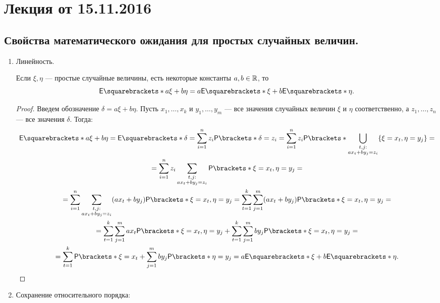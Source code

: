 \section {Лекция от 15.11.2016}

\subsection{Свойства математического ожидания для простых случайных величин.}

\begin{enumerate}
    \item Линейность. \par
    Если $ \xi, \eta $ --- простые случайные величины, есть некоторые константы $ a, b \in \mathbb{R} $, то 
    \[
        \E{a\xi + b\eta} = a\E{\xi} + b\E{\eta}.
    \] 
        \begin{proof}
            Введем обозначение \(\delta = a\xi + b\eta \).
            Пусть \(x_1, \ldots, x_k \) и \(y_1, \ldots, y_m \) --- все значения случайных величин $ \xi $ и $ \eta $ соответственно, а \(z_1, \ldots, z_n \) --- все значения $ \delta $. Тогда:
            \begin{multline*}
                \E{a\xi + b\eta} = \E{\delta} = \sum\limits_{i = 1}^{n}z_i\Pr{\delta = z_i} = \sum\limits_{i = 1}^{n}z_i
                \Pr{\bigcup\limits_{\substack{t, j:\\ ax_t + by_j = z_i}}\{\xi = x_t, \eta = y_j \}} = \\ =
                \sum\limits_{i = 1}^{n}z_i\sum\limits_{\substack{t, j:\\ ax_t + by_j = z_i}}\Pr{\xi = x_t, \eta = y_j} = \\ =
                \sum\limits_{i = 1}^{n}\sum\limits_{\substack{t, j:\\ ax_t + by_j = z_i}}(ax_t + by_j)\Pr{\xi = x_t, \eta = y_j} = 
                \sum\limits_{t = 1}^{k}\sum\limits_{j = 1}^{m}(ax_t + by_j)\Pr{\xi = x_t, \eta = y_j} = \\ =
                \sum\limits_{t = 1}^{k}\sum\limits_{j = 1}^{m}ax_t\Pr{\xi = x_t, \eta = y_j} +
                \sum\limits_{t = 1}^{k}\sum\limits_{j = 1}^{m}by_j\Pr{\xi = x_t, \eta = y_j} = \\ =
                \sum\limits_{t = 1}^{k}\Pr{\xi = x_t} + \sum\limits_{j = 1}^{m}by_j\Pr{\eta = y_j} = a\E{\xi} + b\E{\eta}.
            \end{multline*}
        \end{proof}
    \item Сохранение относительного порядка: \par

\end{enumerate}
